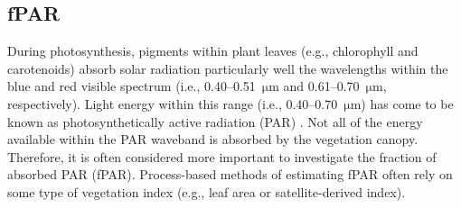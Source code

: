 \subsection{fPAR}
\label{sec:gepmodis}
During photosynthesis, pigments within plant leaves (e.g., chlorophyll and carotenoids) absorb solar radiation particularly well the wavelengths within the blue and red visible spectrum (i.e., 0.40--0.51~$\mathrm{\mu}$m and 0.61--0.70~$\mathrm{\mu}$m, respectively).  
Light energy within this range (i.e., 0.40--0.70~$\mathrm{\mu}$m) has come to be known as photosynthetically active radiation (PAR) \parencite{oke87}.  
Not all of the energy available within the PAR waveband is absorbed by the vegetation canopy.  
Therefore, it is often considered more important to investigate the fraction of absorbed PAR (fPAR).  
Process-based methods of estimating fPAR often rely on some type of vegetation index (e.g., leaf area or satellite-derived index).

